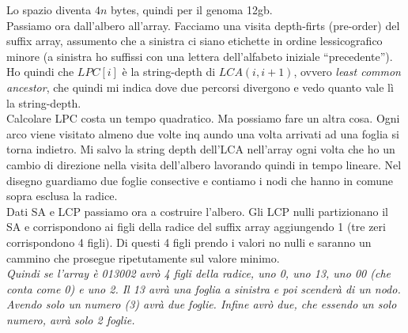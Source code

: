 \documentclass[a4paper,12pt, oneside]{book}
\begin{document}
Lo spazio diventa $4n$ bytes, quindi per il genoma 12gb.\\
Passiamo ora dall'albero all'array. Facciamo una visita depth-firts
(pre-order) del suffix array, assumento che a sinistra ci siano
etichette in ordine lessicografico minore (a sinistra ho suffissi con
una lettera dell'alfabeto iniziale ``precedente'').\\
Ho quindi che $LPC[i]$ è la string-depth di $LCA(i, i+1)$, ovvero
\textit{least common ancestor}, che quindi mi indica dove due percorsi
divergono e vedo quanto vale lì la string-depth.\\
Calcolare LPC costa un tempo quadratico. Ma possiamo fare un altra
cosa. Ogni arco viene visitato almeno due volte inq aundo una volta arrivati
ad una foglia si torna indietro. Mi salvo la string depth dell'LCA
nell'array ogni volta che ho un cambio di direzione nella visita dell'albero
lavorando quindi in tempo lineare. Nel disegno guardiamo due foglie
consective e contiamo i nodi che hanno in comune sopra esclusa la radice.\\
Dati SA e LCP passiamo ora a costruire l'albero. Gli LCP nulli
partizionano il SA e corrispondono ai figli della radice del suffix
array aggiungendo 1 (tre zeri corrispondono 4 figli). Di questi 4
figli prendo i valori no nulli e saranno un cammino che prosegue
ripetutamente sul valore minimo.\\
\textit{Quindi se l'array è 013002 avrò 4 figli della radice, uno 0, uno 13,
  uno 00 (che conta come 0) e uno 2. Il 13 avrà una foglia a sinistra e
  poi scenderà di un nodo. Avendo solo un numero (3) avrà due
  foglie. Infine avrò due, che essendo un solo numero, avrà solo 2
  foglie.}\\
\end{document}
